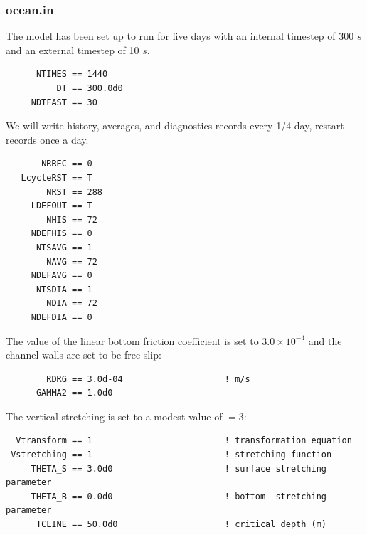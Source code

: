 \subsubsection{ocean.in}
The model has been set up to run for five days with an internal timestep
of 300 $s$ and an external timestep of 10 $s$.
\begin{verbatim}
      NTIMES == 1440
          DT == 300.0d0
     NDTFAST == 30
\end{verbatim}
  We will write history, averages, and diagnostics
records every 1/4 day, restart records once a day.
\begin{verbatim}
       NRREC == 0
   LcycleRST == T
        NRST == 288
     LDEFOUT == T
        NHIS == 72
     NDEFHIS == 0
      NTSAVG == 1
        NAVG == 72
     NDEFAVG == 0
      NTSDIA == 1
        NDIA == 72
     NDEFDIA == 0
\end{verbatim}
  The value of the linear bottom
friction coefficient  is set to $3.0 \times 10^{-4}$ and the
channel walls are set to be free-slip:
\begin{verbatim}
        RDRG == 3.0d-04                    ! m/s
      GAMMA2 == 1.0d0
\end{verbatim}
The vertical stretching is set to a modest value of
$=3$:
\begin{verbatim}
  Vtransform == 1                          ! transformation equation
 Vstretching == 1                          ! stretching function
     THETA_S == 3.0d0                      ! surface stretching parameter
     THETA_B == 0.0d0                      ! bottom  stretching parameter
      TCLINE == 50.0d0                     ! critical depth (m)
\end{verbatim}

